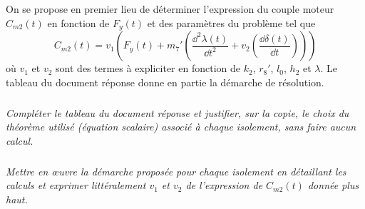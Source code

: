 On se propose en premier lieu de déterminer l’expression du couple moteur $C_{m2}(t)$ en fonction de  $F_y(t)$ et des paramètres du problème tel que
$$C_{m2}(t)=v_1\left( 
F_y(t)+m_7'\left( \dfrac{\dd^2 \lambda(t) }{\dd t^2}+v_2 \left( \dfrac{\dd \delta(t) }{\dd t}\right)
\right)\right)
$$
où $v_1$ et $v_2$ sont des termes à expliciter en fonction de
$k_2$, $r_8'$, $l_0$, $h_2$ et $\lambda$.
Le tableau du document réponse donne en partie la démarche de résolution.


\subparagraph{}
\textit{Compléter le tableau du document réponse et justifier, sur la copie, le choix du théorème utilisé (équation scalaire) associé à chaque isolement, sans faire aucun calcul.}
\ifprof
\begin{corrige}
\end{corrige}
\else
\fi


\subparagraph{}
\textit{Mettre en \oe{}uvre la démarche proposée pour chaque isolement en détaillant les calculs et exprimer littéralement $v_1$ et $v_2$ de l’expression de $C_{m2}(t)$ donnée plus haut.}
\ifprof
\begin{corrige}
\end{corrige}
\else
\fi

